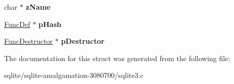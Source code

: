 \begin{DoxyCompactItemize}
\item 
\hypertarget{struct_func_def_a1135e622a3a505c7c463e975846ef926}{char $\ast$ {\bfseries z\+Name}}\label{struct_func_def_a1135e622a3a505c7c463e975846ef926}

\item 
\hypertarget{struct_func_def_a04561444155a6922d6a2d99a29d35281}{\hyperlink{struct_func_def}{Func\+Def} $\ast$ {\bfseries p\+Hash}}\label{struct_func_def_a04561444155a6922d6a2d99a29d35281}

\item 
\hypertarget{struct_func_def_a1bd12675375b838b5c00b1c79c1e6301}{\hyperlink{struct_func_destructor}{Func\+Destructor} $\ast$ {\bfseries p\+Destructor}}\label{struct_func_def_a1bd12675375b838b5c00b1c79c1e6301}

\end{DoxyCompactItemize}


The documentation for this struct was generated from the following file\+:\begin{DoxyCompactItemize}
\item 
sqlite/sqlite-\/amalgamation-\/3080700/sqlite3.\+c\end{DoxyCompactItemize}
